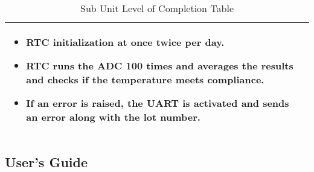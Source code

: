 \begin{landscape}
\begin{table}[!ht]
\begin{tabularx}{\textwidth}{|X|X|}
\begin{itemize}
          \item RTC initialization at once twice per day.
          \item RTC runs the ADC 100 times and averages the results and checks if the temperature meets compliance.
          \item If an error is raised, the UART is activated and sends an error along with the lot number.
        \end{itemize}\\
      \hline
    \end{tabularx}
    \caption{Sub Unit Level of Completion Table}
    \label{tab:sub-unit-completion-table}
  \end{table}
\end{landscape}
\subsection{User’s Guide}

